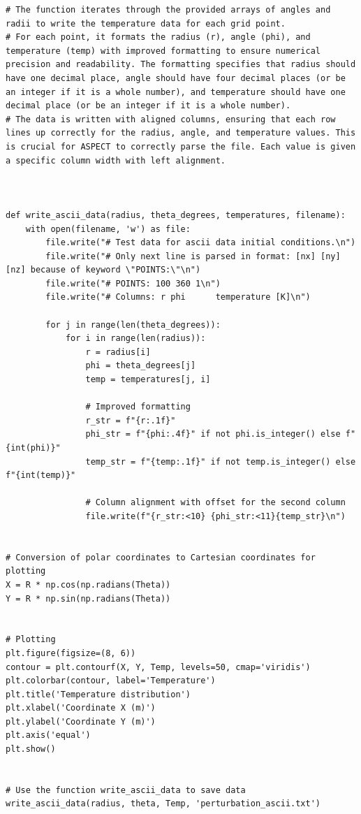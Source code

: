 \documentclass{article}
\begin{document}
\begin{verbatim}
# The function iterates through the provided arrays of angles and radii to write the temperature data for each grid point.
# For each point, it formats the radius (r), angle (phi), and temperature (temp) with improved formatting to ensure numerical precision and readability. The formatting specifies that radius should have one decimal place, angle should have four decimal places (or be an integer if it is a whole number), and temperature should have one decimal place (or be an integer if it is a whole number).
# The data is written with aligned columns, ensuring that each row lines up correctly for the radius, angle, and temperature values. This is crucial for ASPECT to correctly parse the file. Each value is given a specific column width with left alignment.



def write_ascii_data(radius, theta_degrees, temperatures, filename):
    with open(filename, 'w') as file:
        file.write("# Test data for ascii data initial conditions.\n")
        file.write("# Only next line is parsed in format: [nx] [ny] [nz] because of keyword \"POINTS:\"\n")
        file.write("# POINTS: 100 360 1\n")
        file.write("# Columns: r phi      temperature [K]\n")

        for j in range(len(theta_degrees)):
            for i in range(len(radius)):
                r = radius[i]
                phi = theta_degrees[j]
                temp = temperatures[j, i]

                # Improved formatting
                r_str = f"{r:.1f}"
                phi_str = f"{phi:.4f}" if not phi.is_integer() else f"{int(phi)}"
                temp_str = f"{temp:.1f}" if not temp.is_integer() else f"{int(temp)}"

                # Column alignment with offset for the second column
                file.write(f"{r_str:<10} {phi_str:<11}{temp_str}\n")


# Conversion of polar coordinates to Cartesian coordinates for plotting
X = R * np.cos(np.radians(Theta))
Y = R * np.sin(np.radians(Theta))


# Plotting
plt.figure(figsize=(8, 6))
contour = plt.contourf(X, Y, Temp, levels=50, cmap='viridis')
plt.colorbar(contour, label='Temperature')
plt.title('Temperature distribution')
plt.xlabel('Coordinate X (m)')
plt.ylabel('Coordinate Y (m)')
plt.axis('equal')
plt.show()


# Use the function write_ascii_data to save data
write_ascii_data(radius, theta, Temp, 'perturbation_ascii.txt')


\end{verbatim}
\end{document}
